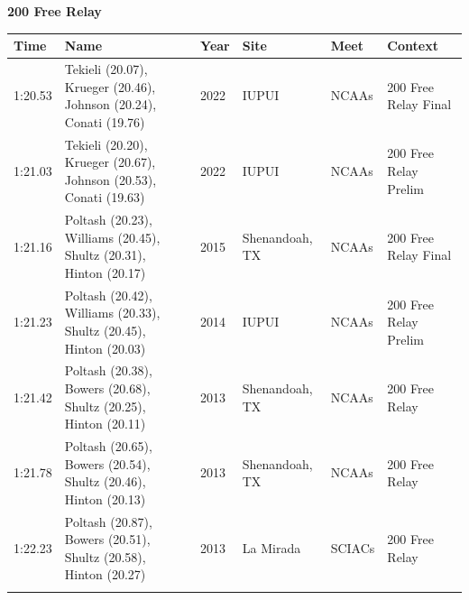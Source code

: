 \noindent\begin{minipage}[t]{0.98\textwidth}
\centering
\textbf{\textcolor{teamprimary}{200 Free Relay}}\par
\vspace{0.5em}
\centering
\small
\renewcommand{\arraystretch}{1.0}
\setlength{\tabcolsep}{4pt}
\begin{tabular}{@{}p{2.0cm}p{3.2cm}p{1.2cm}p{2.0cm}p{2.0cm}p{2.5cm}@{}}
\toprule
\textbf{Time} & \textbf{Name} & \textbf{Year} & \textbf{Site} & \textbf{Meet} & \textbf{Context} \\
\midrule
1:20.53 & Tekieli (20.07), Krueger (20.46), Johnson (20.24), Conati (19.76) & 2022 & IUPUI & NCAAs & 200 Free Relay Final \\
1:21.03 & Tekieli (20.20), Krueger (20.67), Johnson (20.53), Conati (19.63) & 2022 & IUPUI & NCAAs & 200 Free Relay Prelim \\
1:21.16 & Poltash (20.23), Williams (20.45), Shultz (20.31), Hinton (20.17) & 2015 & Shenandoah, TX & NCAAs & 200 Free Relay Final \\
1:21.23 & Poltash (20.42), Williams (20.33), Shultz (20.45), Hinton (20.03) & 2014 & IUPUI & NCAAs & 200 Free Relay Prelim \\
1:21.42 & Poltash (20.38), Bowers (20.68), Shultz (20.25), Hinton (20.11) & 2013 & Shenandoah, TX & NCAAs & 200 Free Relay \\
1:21.78 & Poltash (20.65), Bowers (20.54), Shultz (20.46), Hinton (20.13) & 2013 & Shenandoah, TX & NCAAs & 200 Free Relay \\
1:22.23 & Poltash (20.87), Bowers (20.51), Shultz (20.58), Hinton (20.27) & 2013 & La Mirada & SCIACs & 200 Free Relay \\
\bottomrule
\vspace{0.5em}
\end{tabular}
\end{minipage}
\vspace{1.2em}
